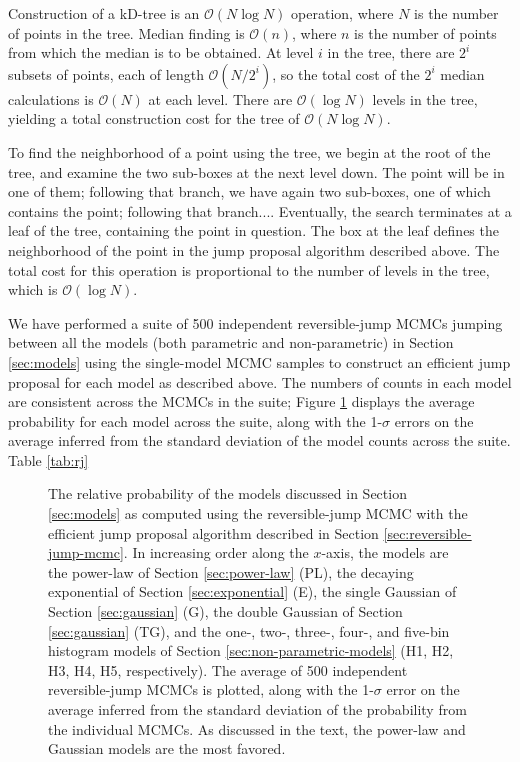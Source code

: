 \documentclass[preprint]{aastex}
\newcommand{\order}[1]{\mathcal{O}\left( #1 \right)}
\begin{document}
Construction of a kD-tree is an $\order{N\log N}$ operation, where $N$
is the number of points in the tree.  Median finding is $\order{n}$,
where $n$ is the number of points from which the median is to be
obtained.  At level $i$ in the tree, there are $2^i$ subsets of
points, each of length $\order{N/2^i}$, so the total cost of the $2^i$
median calculations is $\order{N}$ at each level.  There are
$\order{\log N}$ levels in the tree, yielding a total construction
cost for the tree of $\order{N \log N}$.  

To find the neighborhood of a point using the tree, we begin at the
root of the tree, and examine the two sub-boxes at the next level
down.  The point will be in one of them; following that branch, we
have again two sub-boxes, one of which contains the point; following
that branch....  Eventually, the search terminates at a leaf of the
tree, containing the point in question.  The box at the leaf defines
the neighborhood of the point in the jump proposal algorithm described
above.  The total cost for this operation is proportional to the
number of levels in the tree, which is $\order{\log N}$.

We have performed a suite of 500 independent reversible-jump MCMCs
jumping between all the models (both parametric and non-parametric)
in Section \ref{sec:models} using the single-model MCMC samples to
construct an efficient jump proposal for each model as described
above.  The numbers of counts in each model are consistent across the
MCMCs in the suite; Figure \ref{fig:rj} displays the average
probability for each model across the suite, along with the 1-$\sigma$
errors on the average inferred from the standard deviation of the
model counts across the suite.  Table \ref{tab:rj}

\begin{figure}
  \begin{center}
  \end{center}
  \caption{\label{fig:rj} The relative probability of the models
    discussed in Section \ref{sec:models} as computed using the
    reversible-jump MCMC with the efficient jump proposal algorithm
    described in Section \ref{sec:reversible-jump-mcmc}.  In
    increasing order along the $x$-axis, the models are the power-law
    of Section \ref{sec:power-law} (PL), the decaying exponential of
    Section \ref{sec:exponential} (E), the single Gaussian of Section
    \ref{sec:gaussian} (G), the double Gaussian of Section
    \ref{sec:gaussian} (TG), and the one-, two-, three-, four-, and
    five-bin histogram models of Section
    \ref{sec:non-parametric-models} (H1, H2, H3, H4, H5,
    respectively).  The average of 500 independent reversible-jump
    MCMCs is plotted, along with the 1-$\sigma$ error on the average
    inferred from the standard deviation of the probability from the
    individual MCMCs.  As discussed in the text, the power-law and
    Gaussian models are the most favored.}
\end{figure}
\end{document}

